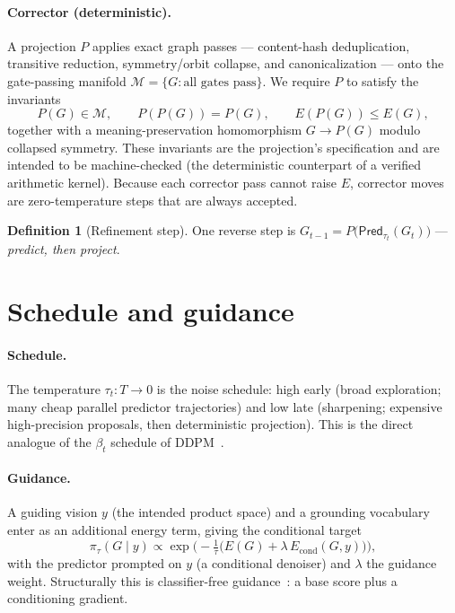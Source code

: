 \documentclass[11pt,letterpaper]{article}
\theoremstyle{plain}
\theoremstyle{definition}
\newtheorem{definition}[theorem]{Definition}
\newcommand{\Mani}{\mathcal{M}}
\newcommand{\Proj}{P}
\begin{document}
\paragraph{Corrector (deterministic).} A projection $\Proj$ applies exact graph
passes --- content-hash deduplication, transitive reduction, symmetry/orbit
collapse, and canonicalization --- onto the gate-passing manifold
$\Mani=\{G:\text{all gates pass}\}$. We require $\Proj$ to satisfy the invariants
\begin{equation}
\label{eq:proj}
  \Proj(G)\in\Mani,\qquad \Proj(\Proj(G))=\Proj(G),\qquad E(\Proj(G))\le E(G),
\end{equation}
together with a meaning-preservation homomorphism $G\to\Proj(G)$ modulo collapsed
symmetry. These invariants are the projection's specification and are intended to
be machine-checked (the deterministic counterpart of a verified arithmetic
kernel). Because each corrector pass cannot raise $E$, corrector moves are
zero-temperature steps that are always accepted.

\begin{definition}[Refinement step]
One reverse step is $G_{t-1}=\Proj\big(\mathsf{Pred}_{\tau_t}(G_t)\big)$ ---
\emph{predict, then project}.
\end{definition}

\section{Schedule and guidance}
\label{sec:schedule}

\paragraph{Schedule.} The temperature $\tau_t:T\to 0$ is the noise schedule:
high early (broad exploration; many cheap parallel predictor trajectories) and low
late (sharpening; expensive high-precision proposals, then deterministic
projection). This is the direct analogue of the $\beta_t$ schedule of
DDPM~\cite{ho2020ddpm}.

\paragraph{Guidance.} A guiding vision $y$ (the intended product space) and a
grounding vocabulary enter as an additional energy term, giving the conditional
target
\[
  \pi_\tau(G\mid y)\propto\exp\!\Big(-\tfrac{1}{\tau}\big(E(G)+\lambda\,E_{\mathrm{cond}}(G,y)\big)\Big),
\]
with the predictor prompted on $y$ (a conditional denoiser) and $\lambda$ the
guidance weight. Structurally this is classifier-free
guidance~\cite{ho2022cfg}: a base score plus a conditioning gradient.
\end{document}
